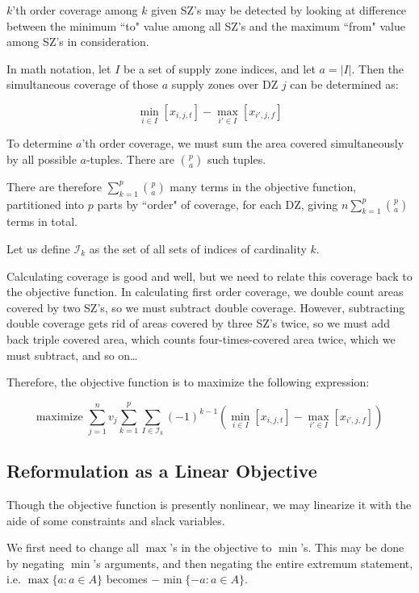 \documentclass[a4paper]{article}
\begin{document}
$k$'th order coverage among $k$ given SZ's may be detected by looking at difference between the minimum ``to" value among all SZ's and the maximum ``from" value among SZ's in consideration.

In math notation, let $I$ be a set of supply zone indices, and let $a = |I|$. Then the simultaneous coverage of those $a$ supply zones over DZ $j$ can be determined as:

$$\min_{i \in I} [x_{i,j,t}] - \max_{i' \in I} [x_{i',j,f}]$$

To determine $a$'th order coverage, we must sum the area covered simultaneously by all possible $a$-tuples. There are $p\choose a$ such tuples.

There are therefore $\sum_{k=1}^p {p\choose a}$ many terms in the objective function, partitioned into $p$ parts by ``order" of coverage, for each DZ, giving $n\sum_{k=1}^p {p\choose a}$ terms in total.

Let us define $\mathcal{I}_k$ as the set of all sets of indices of cardinality $k$.

\vspace{1em}

Calculating coverage is good and well, but we need to relate this coverage back to the objective function. In calculating first order coverage, we double count areas covered by two SZ's, so we must subtract double coverage. However, subtracting double coverage gets rid of areas covered by three SZ's twice, so we must add back triple covered area, which counts four-times-covered area twice, which we must subtract, and so on\ldots

Therefore, the objective function is to maximize the following expression:

$$\textrm{maximize } \sum_{j=1}^n v_j \sum_{k=1}^{p} \sum_{I \in \mathcal{I}_k} 
(-1)^{k-1}(\min_{i \in I} [x_{i,j,t}] - \max_{i' \in I} [x_{i',j,f}])$$

\subsection{Reformulation as a Linear Objective}

Though the objective function is presently nonlinear, we may linearize it with the aide of some constraints and slack variables.

We first need to change all $\max$'s in the objective to $\min$'s. This may be done by negating $\min$'s arguments, and then negating the entire extremum statement, i.e. $\max\{a : a \in A\}$ becomes $-\min\{-a : a \in A\}$.
\end{document}
